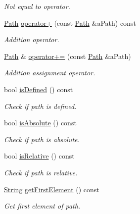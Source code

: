 \begin{DoxyCompactItemize}
\begin{DoxyCompactList}\small\item\em Not equal to operator. \end{DoxyCompactList}\item 
\hyperlink{classlibrary_1_1core_1_1fs_1_1_path}{Path} \hyperlink{classlibrary_1_1core_1_1fs_1_1_path_a3f86a7054939a51f44b2f5a796470071}{operator+} (const \hyperlink{classlibrary_1_1core_1_1fs_1_1_path}{Path} \&a\+Path) const
\begin{DoxyCompactList}\small\item\em Addition operator. \end{DoxyCompactList}\item 
\hyperlink{classlibrary_1_1core_1_1fs_1_1_path}{Path} \& \hyperlink{classlibrary_1_1core_1_1fs_1_1_path_a3fae713dbf257fdcec2fdb2ec6c27256}{operator+=} (const \hyperlink{classlibrary_1_1core_1_1fs_1_1_path}{Path} \&a\+Path)
\begin{DoxyCompactList}\small\item\em Addition assignment operator. \end{DoxyCompactList}\item 
bool \hyperlink{classlibrary_1_1core_1_1fs_1_1_path_a4315cfd12f61bf477e010f33122c3d0c}{is\+Defined} () const
\begin{DoxyCompactList}\small\item\em Check if path is defined. \end{DoxyCompactList}\item 
bool \hyperlink{classlibrary_1_1core_1_1fs_1_1_path_a9a5772dfc1273a74137ca301e9a84d61}{is\+Absolute} () const
\begin{DoxyCompactList}\small\item\em Check if path is absolute. \end{DoxyCompactList}\item 
bool \hyperlink{classlibrary_1_1core_1_1fs_1_1_path_a97cf61b699efe17e23ac3a91daf897e2}{is\+Relative} () const
\begin{DoxyCompactList}\small\item\em Check if path is relative. \end{DoxyCompactList}\item 
\hyperlink{classlibrary_1_1core_1_1types_1_1_string}{String} \hyperlink{classlibrary_1_1core_1_1fs_1_1_path_a2d2c6d44f2a229948ea564d3ba8bc456}{get\+First\+Element} () const
\begin{DoxyCompactList}\small\item\em Get first element of path. \end{DoxyCompactList}\item 

\end{DoxyCompactItemize}
